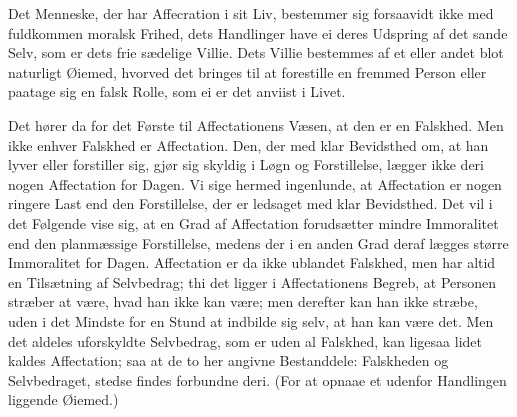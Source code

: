 \documentclass[12pt]{article}
\begin{document}
Det Menneske, der har Affecration i sit Liv, bestemmer sig forsaavidt ikke med fuldkommen moralsk Frihed, dets Handlinger have ei deres Udspring af det sande Selv, som er dets frie sædelige Villie. Dets Villie bestemmes af et eller andet blot naturligt Øiemed, hvorved det bringes til at forestille en fremmed Person eller paatage sig en falsk Rolle, som ei er det anviist i Livet.

Det hører da for det Første til Affectationens Væsen, at den er en Falskhed. Men ikke enhver Falskhed er Affectation. Den, der med klar Bevidsthed om, at han lyver eller forstiller sig, gjør sig skyldig i Løgn og Forstillelse, lægger ikke deri nogen Affectation for Dagen. Vi sige hermed ingenlunde, at Affectation er nogen ringere Last end den Forstillelse, der er ledsaget med klar Bevidsthed. Det vil i det Følgende vise sig, at en Grad af Affectation forudsætter mindre Immoralitet end den planmæssige Forstillelse, medens der i en anden Grad deraf lægges større Immoralitet for Dagen. Affectation er da ikke ublandet Falskhed, men har altid en Tilsætning af Selvbedrag; thi det ligger i Affectationens Begreb, at Personen stræber at være, hvad han ikke kan være; men derefter kan han ikke stræbe, uden i det Mindste for en Stund at indbilde sig selv, at han kan være det. Men det aldeles uforskyldte Selvbedrag, som er uden al Falskhed, kan ligesaa lidet kaldes Affectation; saa at de to her angivne Bestanddele: Falskheden og Selvbedraget, stedse findes forbundne deri. (For at opnaae et udenfor Handlingen liggende Øiemed.)
\end{document}
